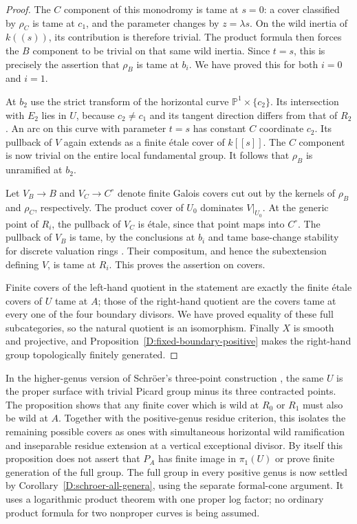 \begin{proof}
The $C$ component of this monodromy is tame at $s=0$: a cover
classified by $\rho_C$ is tame at $c_1$, and the parameter changes
by $z=\lambda s$.  On the wild inertia of $k((s))$, its contribution
is therefore trivial.  The product formula then forces the
$B$ component to be trivial on that same wild inertia.  Since
$t=s$, this is precisely the assertion that $\rho_B$ is tame at
$b_i$.  We have proved this for both $i=0$ and $i=1$.

At $b_2$ use the strict transform of the horizontal curve
$\mathbb P^1\times\{c_2\}$.  Its intersection with $E_2$ lies in
$U$, because $c_2\ne c_1$ and its tangent direction differs from
that of $R_2$.  An arc on this curve with parameter $t=s$ has
constant $C$ coordinate $c_2$.  Its pullback of $V$ again extends
as a finite \'etale cover of $k[[s]]$.  The $C$ component is now
trivial on the entire local fundamental group.  It follows that
$\rho_B$ is unramified at $b_2$.

Let $V_B\to B$ and $V_C\to C^\circ$ denote finite Galois covers
cut out by the kernels of $\rho_B$ and $\rho_C$, respectively.
The product cover of $U_0$ dominates $V|_{U_0}$.  At the generic
point of $R_i$, the pullback of $V_C$ is \'etale, since that point
maps into $C^\circ$.  The pullback of $V_B$ is tame, by the
conclusions at $b_i$ and tame base-change stability for discrete
valuation rings
\cite[section 15.116, Lemma 15.116.9]{StacksBIndexTame}.
Their compositum, and hence the subextension defining $V$, is
tame at $R_i$.  This proves the assertion on covers.

Finite covers of the left-hand quotient in the statement are
exactly the finite \'etale covers of $U$ tame at $A$; those of the
right-hand quotient are the covers tame at every one of the four
boundary divisors.  We have proved equality of these full
subcategories, so the natural quotient is an isomorphism.
Finally $X$ is smooth and projective, and
Proposition~\ref{D:fixed-boundary-positive} makes the right-hand
group topologically finitely generated.
\end{proof}

\begin{remark}
In the higher-genus version of Schr\"oer's three-point construction
\cite[sections 2.5 and 3.1--3.2, author's PDF pp.~4--5]{Schroer1999D},
the same $U$ is the proper surface with trivial Picard group minus
its three contracted points.  The proposition shows that any
finite cover which is wild at $R_0$ or $R_1$ must also be wild at
$A$.  Together with the positive-genus residue criterion, this
isolates the remaining possible covers as ones with simultaneous
horizontal wild ramification and inseparable residue extension
at a vertical exceptional divisor.  By itself this proposition does not
assert that $P_A$ has finite image in $\pi_1(U)$ or prove finite
generation of the full group.  The full group in every positive
genus is now settled by Corollary~\ref{D:schroer-all-genera},
using the separate formal-cone argument.  It uses a logarithmic product theorem with one proper log
factor; no ordinary product formula for two nonproper curves is
being assumed.
\end{remark}

